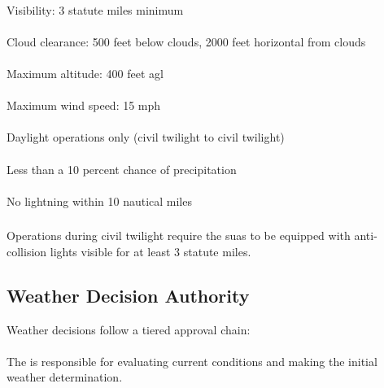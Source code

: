             \paragraph{} Visibility: 3 statute miles minimum
            \paragraph{} Cloud clearance: 500 feet below clouds, 2000 feet horizontal from clouds
            \paragraph{} Maximum altitude: 400 feet \ac{agl}
            \paragraph{} Maximum wind speed: 15 mph
            \paragraph{} Daylight operations only (civil twilight to civil twilight)
            \paragraph{} Less than a 10 percent chance of precipitation
            \paragraph{} No lightning within 10 nautical miles

        \subsubsection{} Operations during civil twilight require the \ac{suas} to be equipped with anti-collision lights visible for at least 3 statute miles.

    \subsection{Weather Decision Authority}\label{ssec:weatherdecision}

        Weather decisions follow a tiered approval chain:
            \paragraph{}The  is responsible for evaluating current conditions and making the initial weather determination.

